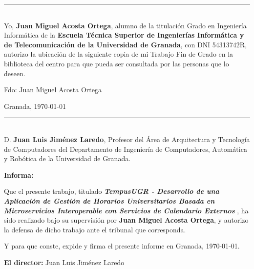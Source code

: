 \newpage \thispagestyle{empty} \mbox{} \newpage
\vspace{5cm}
\noindent\rule[-1ex]{\textwidth}{2pt}\\[4.5ex]

Yo, \textbf{Juan Miguel Acosta Ortega}, alumno de la titulación Grado en Ingeniería Informática de la \textbf{Escuela Técnica Superior
de Ingenierías Informática y de Telecomunicación de la Universidad de Granada}, con DNI 54313742R, autorizo la ubicación de la siguiente copia de mi Trabajo Fin de Grado en la biblioteca del centro para que pueda ser
consultada por las personas que lo deseen.

\vspace{6cm}

\noindent Fdo: Juan Miguel Acosta Ortega

\vspace{2cm}

\begin{flushright}
Granada, \today
\end{flushright}

\newpage \thispagestyle{empty} \mbox{} \newpage

\newpage
\vspace{5cm}
\noindent\rule[-1ex]{\textwidth}{2pt}\\[4.5ex]

D. \textbf{Juan Luis Jiménez Laredo}, Profesor del Área de Arquitectura y Tecnología de Computadores
del Departamento de Ingeniería de Computadores, Automática y Robótica de la Universidad de Granada.

\vspace{0.5cm}

\textbf{Informa:}

\vspace{0.5cm}

Que el presente trabajo, titulado \textit{\textbf{ TempusUGR - Desarrollo de una Aplicación de Gestión de Horarios Universitarios Basada en Microservicios Interoperable con Servicios de Calendario Externos }}, ha sido realizado bajo su supervisión por \textbf{Juan Miguel Acosta Ortega}, y autorizo la defensa de dicho trabajo ante el tribunal que corresponda.

\vspace{0.5cm}

Y para que conste, expide y firma el presente informe en Granada, \today.

\vspace{1cm}

\textbf{El director:} Juan Luis Jiménez Laredo

\newpage \thispagestyle{empty} \mbox{} \newpage